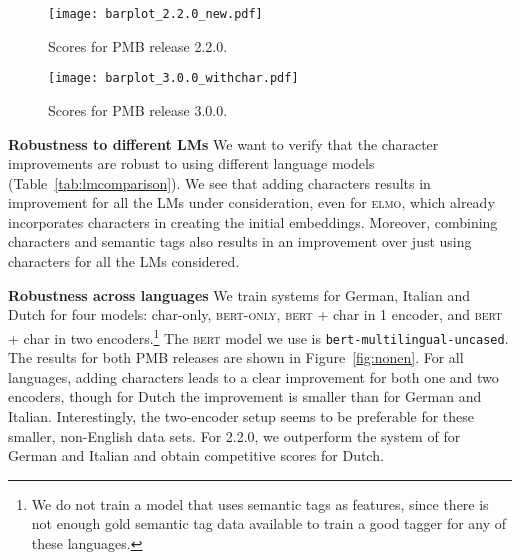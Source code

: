 \documentclass[11pt,a4paper]{article}
\newcommand{\bert}{\textsc{bert}}
\newcommand{\bertonly}{\textsc{bert-only}}
\newcommand{\elmo}{\textsc{elmo}}
\newcommand{\inlineheader}[1]{\vspace{0.06cm}
\noindent\textbf{#1}\quad
}
\begin{document}
\begin{figure*}[!htb]
\centering
\begin{subfigure}{.5\textwidth}
  \centering
  \texttt{[image: barplot\_2.2.0\_new.pdf]}
  \caption{Scores for PMB release 2.2.0.}
\end{subfigure}\begin{subfigure}{.5\textwidth}
  \centering
 \texttt{[image: barplot\_3.0.0\_withchar.pdf]}
   \caption{Scores for PMB release 3.0.0.}
  \label{fig:sub2}
\end{subfigure}
\caption{\label{fig:nonen}Dev and test scores (F1) for the four models we trained for three languages (German, Italian and Dutch). For 2.2.0, we compare our results to \citet{fancellu-etal-2019-semantic}.}
\vspace{-0.3cm}
\end{figure*}



\inlineheader{Robustness to different LMs} We want to verify that the character improvements are robust to using different language models (Table~\ref{tab:lmcomparison}). We see that adding characters results in improvement for all the LMs under consideration, even for \elmo{}, which already incorporates characters in creating the initial embeddings. Moreover, combining characters and semantic tags also results in an improvement over just using characters for all the LMs considered.

\inlineheader{Robustness across languages} We train systems for German, Italian and Dutch for four models: char-only, \bertonly{}, \bert{} + char in 1 encoder, and \bert{} + char in two encoders.\footnote{We do not train a model that uses semantic tags as features, since there is not enough gold semantic tag data available to train a good tagger for any of these languages.} The \bert{} model we use is \texttt{bert-multilingual-uncased}. The results for both PMB releases are shown in Figure~\ref{fig:nonen}. For all languages, adding characters leads to a clear improvement for both one and two encoders, though for Dutch the improvement is smaller than for German and Italian. Interestingly, the two-encoder setup seems to be preferable for these smaller, non-English data sets. For 2.2.0, we outperform the system of \citet{fancellu-etal-2019-semantic} for German and Italian and obtain competitive scores for Dutch.
\end{document}
